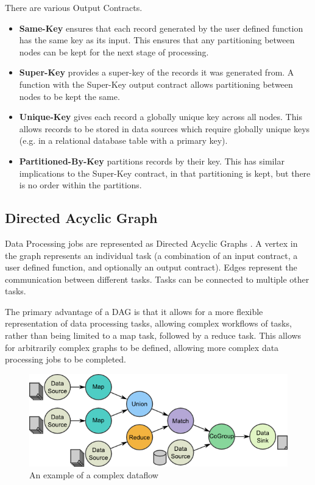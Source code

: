 There are various Output Contracts.

\begin{itemize}
	\item \textbf{Same-Key} ensures that each record generated by the user defined function has the same key as its input. This ensures that any partitioning between nodes can be kept for the next stage of processing.
	\item \textbf{Super-Key} provides a super-key of the records it was generated from. A function with the Super-Key output contract allows partitioning between nodes to be kept the same.
	\item \textbf{Unique-Key} gives each record a globally unique key across all nodes. This allows records to be stored in data sources which require globally unique keys (e.g. in a relational database table with a primary key).
	\item \textbf{Partitioned-By-Key} partitions records by their key. This has similar implications to the Super-Key contract, in that partitioning is kept, but there is no order within the partitions.
\end{itemize}
 
\subsection{Directed Acyclic Graph}
Data Processing jobs are represented as Directed Acyclic Graphs \cite{warneke2009nephele}. A vertex in the graph represents an individual task (a combination of an input contract, a user defined function, and optionally an output contract). Edges represent the communication between different tasks. Tasks can be connected to multiple other tasks.

The primary advantage of a DAG is that it allows for a more flexible representation of data processing tasks, allowing complex workflows of tasks, rather than being limited to a map task, followed by a reduce task. This allows for arbitrarily complex graphs to be defined, allowing more complex data processing jobs to be completed. 

\begin{figure}[H]
    \centering
    \includegraphics[scale=0.5]{./resources/dataflow}
    \caption{An example of a complex dataflow \cite{pactModel}}
\end{figure}

